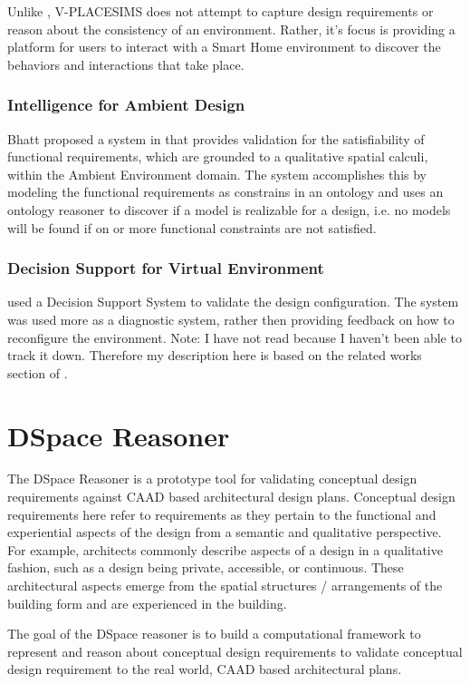 \documentclass[12pt]{ucthesis}
\begin{document}
Unlike \cite{CalderónCLP06}, V-PLACESIMS does not attempt to capture design requirements or reason about the consistency of an environment. Rather, it's focus is providing a platform for users to interact with a Smart Home environment to discover the behaviors and interactions that take place.

\subsection{Intelligence for Ambient Design}
Bhatt proposed a system in \cite{BhattDH09} that provides validation for the satisfiability of functional requirements, which are grounded to a qualitative spatial calculi, within the Ambient Environment domain. The system accomplishes this by modeling the functional requirements as constrains in an ontology and uses an ontology reasoner to discover if a model is realizable for a design, i.e. no models will be found if on or more functional constraints are not satisfied. 

\subsection{Decision Support for Virtual Environment}
\cite{Nomura92} used a Decision Support System to validate the design configuration. The system was used more as a diagnostic system, rather then providing feedback on how to reconfigure the environment. Note: I have not read \cite{Nomura92} because I haven't been able to track it down. Therefore my description here is based on the related works section of \cite{CalderónCLP06}.



\chapter{DSpace Reasoner}
The DSpace Reasoner is a prototype tool for validating conceptual design requirements against CAAD based architectural design plans. Conceptual design requirements here refer to requirements as they pertain to the functional and experiential aspects of the design from a semantic and qualitative perspective. For example, architects commonly describe aspects of a design in a qualitative fashion, such as a design being private, accessible, or continuous. These architectural aspects emerge from the spatial structures / arrangements of the building form and are experienced in the building. 

The goal of the DSpace reasoner is to build a computational framework to represent and reason about conceptual design requirements to validate conceptual design requirement to the real world, CAAD based architectural plans.     
\end{document}

